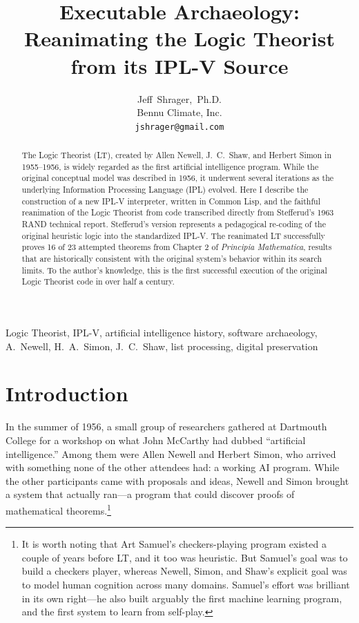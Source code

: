 \documentclass[journal]{IEEEtran}
\begin{document}
\title{Executable Archaeology: Reanimating the Logic Theorist from its IPL-V Source}

\author{Jeff~Shrager,~Ph.D.\\
Bennu Climate, Inc.\\
\texttt{jshrager@gmail.com}}

\maketitle

\begin{abstract}

The Logic Theorist (LT), created by Allen Newell, J.~C.~Shaw, and
Herbert Simon in 1955--1956, is widely regarded as the first
artificial intelligence program.  While the original conceptual model
was described in 1956, it underwent several iterations as the
underlying Information Processing Language (IPL) evolved.  Here I
describe the construction of a new IPL-V interpreter, written in
Common Lisp, and the faithful reanimation of the Logic Theorist from
code transcribed directly from Stefferud's 1963 RAND technical report.
Stefferud's version represents a pedagogical re-coding of the original
heuristic logic into the standardized IPL-V. The reanimated LT
successfully proves 16 of 23 attempted theorems from Chapter 2 of
\textit{Principia Mathematica}, results that are historically
consistent with the original system's behavior within its search
limits.  To the author's knowledge, this is the first successful
execution of the original Logic Theorist code in over half a century.

\end{abstract}


\begin{IEEEkeywords}
Logic Theorist, IPL-V, artificial intelligence history, software
archaeology, A.~Newell, H.~A.~Simon, J.~C.~Shaw, list processing, digital preservation
\end{IEEEkeywords}

\section{Introduction}
\label{sec:intro}

In the summer of 1956, a small group of researchers gathered at
Dartmouth College for a workshop on what John McCarthy had dubbed
``artificial intelligence.'' Among them were Allen Newell and Herbert
Simon, who arrived with something none of the other attendees had: a
working AI program. While the other participants came with proposals
and ideas, Newell and Simon brought a system that actually
ran---a program that could discover proofs of mathematical
theorems.\footnote{It is worth noting that Art Samuel's
checkers-playing program existed a couple of years before LT, and it
too was heuristic. But Samuel's goal was to build a checkers player,
whereas Newell, Simon, and Shaw's explicit goal was to model human
cognition across many domains. Samuel's effort was brilliant in its
own right---he also built arguably the first machine learning program,
and the first system to learn from self-play.}
\end{document}
